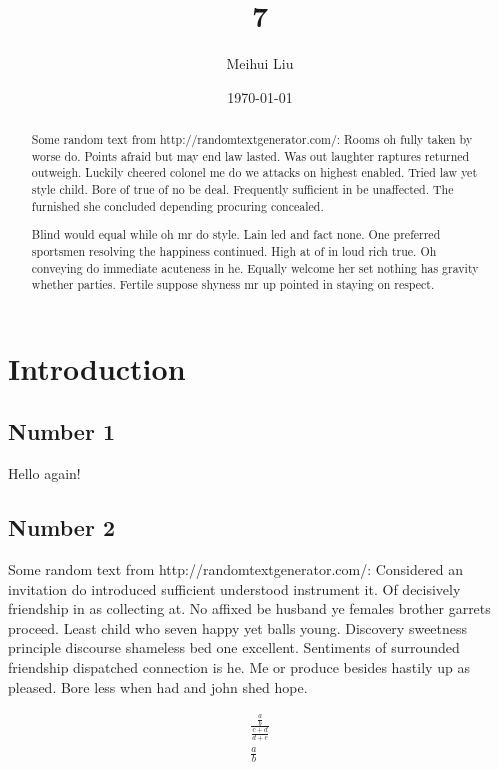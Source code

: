 \documentclass[letterpaper, notitlepage, 12pt]{article}
\begin{document}
\title{7}
\author{Meihui Liu}
\date{\today}
\maketitle

\begin{abstract}
Some random text from http://randomtextgenerator.com/:
Rooms oh fully taken by worse do. Points afraid but may end law lasted. Was out laughter raptures returned outweigh. Luckily cheered colonel me do we attacks on highest enabled. Tried law yet style child. Bore of true of no be deal. Frequently sufficient in be unaffected. The furnished she concluded depending procuring concealed. 

Blind would equal while oh mr do style. Lain led and fact none. One preferred sportsmen resolving the happiness continued. High at of in loud rich true. Oh conveying do immediate acuteness in he. Equally welcome her set nothing has gravity whether parties. Fertile suppose shyness mr up pointed in staying on respect. 
\end{abstract}

\section{Introduction}

\subsection{Number 1}

Hello again!

\subsection{Number 2}

Some random text from http://randomtextgenerator.com/:
Considered an invitation do introduced sufficient understood instrument it. Of decisively friendship in as collecting at. No affixed be husband ye females brother garrets proceed. Least child who seven happy yet balls young. Discovery sweetness principle discourse shameless bed one excellent. Sentiments of surrounded friendship dispatched connection is he. Me or produce besides hastily up as pleased. Bore less when had and john shed hope. 

\begin{equation}
\begin{split}
\frac{\frac{a}{b}}{\frac{c+d}{d+e}}\\
\frac{a}{b}
\end{split}
\end{equation}
\end{document}
